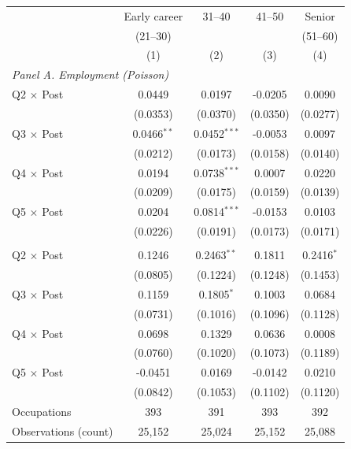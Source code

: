 \begin{tabular}{lcccc}
\toprule
 & Early career & 31--40 & 41--50 & Senior \\
 & (21--30) &  &  & (51--60) \\
 & (1) & (2) & (3) & (4) \\
\midrule
\multicolumn{5}{l}{\textit{Panel A. Employment (Poisson)}} \\
Q2 $\times$ Post & 0.0449 & 0.0197 & -0.0205 & 0.0090 \\
 & (0.0353) & (0.0370) & (0.0350) & (0.0277) \\
Q3 $\times$ Post & 0.0466$^{**}$ & 0.0452$^{***}$ & -0.0053 & 0.0097 \\
 & (0.0212) & (0.0173) & (0.0158) & (0.0140) \\
Q4 $\times$ Post & 0.0194 & 0.0738$^{***}$ & 0.0007 & 0.0220 \\
 & (0.0209) & (0.0175) & (0.0159) & (0.0139) \\
Q5 $\times$ Post & 0.0204 & 0.0814$^{***}$ & -0.0153 & 0.0103 \\
 & (0.0226) & (0.0191) & (0.0173) & (0.0171) \\
\addlinespace
\multicolumn{5}{l}{\textit{Panel B. New hires (Poisson)}} \\
Q2 $\times$ Post & 0.1246 & 0.2463$^{**}$ & 0.1811 & 0.2416$^{*}$ \\
 & (0.0805) & (0.1224) & (0.1248) & (0.1453) \\
Q3 $\times$ Post & 0.1159 & 0.1805$^{*}$ & 0.1003 & 0.0684 \\
 & (0.0731) & (0.1016) & (0.1096) & (0.1128) \\
Q4 $\times$ Post & 0.0698 & 0.1329 & 0.0636 & 0.0008 \\
 & (0.0760) & (0.1020) & (0.1073) & (0.1189) \\
Q5 $\times$ Post & -0.0451 & 0.0169 & -0.0142 & 0.0210 \\
 & (0.0842) & (0.1053) & (0.1102) & (0.1120) \\
\midrule
Occupations & 393 & 391 & 393 & 392 \\
Observations (count) & 25,152 & 25,024 & 25,152 & 25,088 \\
\bottomrule
\end{tabular}

